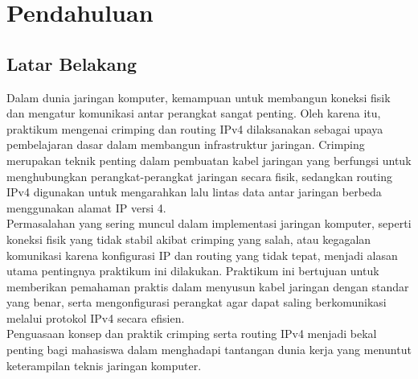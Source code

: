 \section{Pendahuluan}
\subsection{Latar Belakang}
Dalam dunia jaringan komputer, kemampuan untuk membangun koneksi fisik dan mengatur komunikasi antar perangkat sangat penting. Oleh karena itu, praktikum mengenai crimping dan routing IPv4 dilaksanakan sebagai upaya pembelajaran dasar dalam membangun infrastruktur jaringan. Crimping merupakan teknik penting dalam pembuatan kabel jaringan yang berfungsi untuk menghubungkan perangkat-perangkat jaringan secara fisik, sedangkan routing IPv4 digunakan untuk mengarahkan lalu lintas data antar jaringan berbeda menggunakan alamat IP versi 4. \\ Permasalahan yang sering muncul dalam implementasi jaringan komputer, seperti koneksi fisik yang tidak stabil akibat crimping yang salah, atau kegagalan komunikasi karena konfigurasi IP dan routing yang tidak tepat, menjadi alasan utama pentingnya praktikum ini dilakukan. Praktikum ini bertujuan untuk memberikan pemahaman praktis dalam menyusun kabel jaringan dengan standar yang benar, serta mengonfigurasi perangkat agar dapat saling berkomunikasi melalui protokol IPv4 secara efisien. \\ Penguasaan konsep dan praktik crimping serta routing IPv4 menjadi bekal penting bagi mahasiswa dalam menghadapi tantangan dunia kerja yang menuntut keterampilan teknis jaringan komputer.

